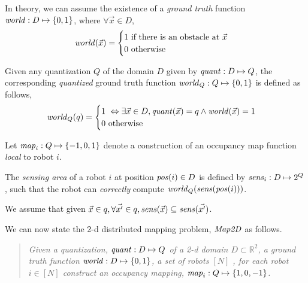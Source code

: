 In theory, we can assume the existence of a \emph{ground truth} function $\mathit{world} : D\mapsto \left\{0,1\right\}$, where $\forall \Vec{x} \in D$, $$\world(\Vec{x}) = \begin{cases}
                                                                                                                                                                        1\ \mbox{if there is an obstacle at }\Vec{x}\\
                                                                                                                                                                        0\ \mbox{otherwise}
\end{cases}
$$

Given any quantization $Q$ of the domain $D$ given by $\mathit{quant}:D\mapsto Q$, the corresponding \emph{quantized} ground truth function
$\mathit{world}_Q : Q \mapsto \left\{0,1\right\}$ is defined as follows,  $$\world_Q(q) = \begin{cases}
                                                                                      1\ \Leftrightarrow \exists \Vec{x}\in D, \qfunc(\Vec{x}) = q \wedge \world(\Vec{x}) = 1 \\
                                                                                      0\ \mbox{otherwise}
\end{cases}
$$

Let $\mathit{map}_i:Q\mapsto \left\{-1,0,1\right\}$ denote a construction of an occupancy map function \emph{local} to robot $i$.  %

\begin{definition}
    The \emph{sensing area} of a robot $i$ at position $\mathit{pos}(i)\in D$ is defined by $\mathit{sens}_i: D \mapsto 2^{Q}$, such that the robot can \emph{correctly} compute $\mathit{world}_Q(\mathit{sens}(\mathit{pos}(i)))$.
\end{definition}

We assume that given $\Vec{x} \in q, \forall \Vec{x^\prime} \in q, \mathit{sens}(\Vec{x}) \subseteq \mathit{sens}(\Vec{x^\prime})$.

We can now state the 2-d distributed mapping problem, $\mathit{Map2D}$ as follows. \begin{quote}
{\em Given a quantization, $\mathit{quant}:D\mapsto Q$ of a 2-d domain $D\subset \mathbb{R}^2$, a ground truth function $\mathit{world}:D \mapsto \left\{0,1\right\}$, a set of robots $[N]$ , for each robot $i \in [N]$ construct an occupancy mapping, $\mathit{map}_i: Q \mapsto \left\{1,0,-1\right\}$.
}
\end{quote}

